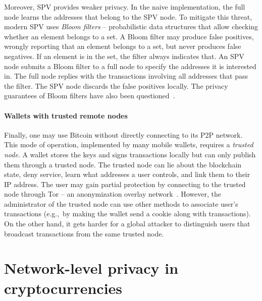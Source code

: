 Moreover, SPV provides weaker privacy.
In the naive implementation, the full node learns the addresses that belong to the SPV node.
To mitigate this threat, modern SPV uses \textit{Bloom filters} -- probabilistic data structures that allow checking whether an element belongs to a set.
A Bloom filter may produce false positives, wrongly reporting that an element belongs to a set, but never produces false negatives.
If an element is in the set, the filter always indicates that.
An SPV node submits a Bloom filter to a full node to specify the addresses it is interested in.
The full node replies with the transactions involving all addresses that pass the filter.
The SPV node discards the false positives locally.
The privacy guarantees of Bloom filters have also been questioned~\cite{Gervais2014}.

\paragraph{Wallets with trusted remote nodes}
Finally, one may use Bitcoin without directly connecting to its P2P network.
This mode of operation, implemented by many mobile wallets, requires a \textit{trusted node}.
A wallet stores the keys and signs transactions locally but can only publish them through a trusted node.
The trusted node can lie about the blockchain state, deny service, learn what addresses a user controls, and link them to their IP address.
The user may gain partial protection by connecting to the trusted node through Tor -- an anonymization overlay network~\cite{Dingledine2004}.
However, the administrator of the trusted node can use other methods to associate user's transactions (e.g.,~by making the wallet send a cookie along with transactions).
On the other hand, it gets harder for a global attacker to distinguish users that broadcast transactions from the same trusted node.


\pagebreak


\section{Network-level privacy in cryptocurrencies}

